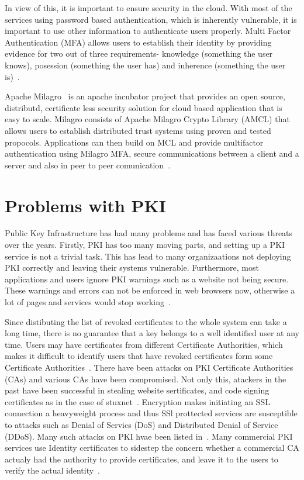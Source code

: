 In view of this, it is important to ensure security in the cloud. With
most of the services using password based authentication, which is
inherently vulnerable, it is important to use other information to
authenticate users properly. Multi Factor Authentication (MFA) allows
users to establish their identity by providing evidence for two out of
three requirements- knowledge (something the user knows), posession
(something the user has) and inherence (something the user
is)~\cite{centrify-mfa}.

Apache Milagro~\cite{milagro-website} is an apache incubator project
that provides an open source, distributd, certificate less security
solution for cloud based application that is easy to scale. Milagro
consists of Apache Milagro Crypto Library (AMCL) that allows users to
establish distributed trust systems using proven and tested
propocols. Applications can then build on MCL and provide multifactor
authentication using Milagro MFA, secure communications between a
client and a server and also in peer to peer
comunication~\cite{milagro-docs-overview}.



\section{Problems with PKI}
Public Key Infrastructure has had many problems and has faced various
threats over the years.  Firstly, PKI has too many moving parts, and
setting up a PKI service is not a trivial task. This has lead to many
organizaations not deploying PKI correctly and leaving their systems
vulnerable. Furthermore, most applications and users ignore PKI
warnings such as a website not being secure. These warnings and errors
can not be enforced in web browsers now, otherwise a lot of pages and
services would stop working~\cite{cso-pki-problems}.

Since distibuting the list of revoked certificates to the whole system
can take a long time, there is no guarantee that a key belongs to a
well identified user at any time. Users may have certificates from
different Certificate Authorities, which makes it difficult to
identify users that have revoked certificates form some Certificate
Authorities~\cite{distlab-pki-problems}.  There have been attacks on
PKI Certificate Authorities (CAs) and various CAs have been
compromised. Not only this, atackers in the past have been successful
in stealing website sertificates, and code signing certificates as in
the case of stuxnet~\cite{securityweek-ssl-threats}. Encryption makes
initiating an SSL connection a heavyweight process and thus SSl
prottected services are susceptible to attacks such as Denial of
Servics (DoS) and Distributed Denial of Service (DDoS). Many such
attacks on PKI hvae been listed in~\cite{cacert-wiki-pki-history}.
Many commercial PKI services use Identity certificates to sidestep the
concern whether a commercial CA actualy had the authority to provide
certificates, and leave it to the users to verify the actual
identity~\cite{ten-pki-risks}.


